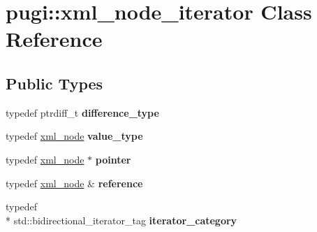 \hypertarget{classpugi_1_1xml__node__iterator}{\section{pugi\+:\+:xml\+\_\+node\+\_\+iterator Class Reference}
\label{classpugi_1_1xml__node__iterator}
}
\subsection*{Public Types}
\begin{DoxyCompactItemize}
\item 
\hypertarget{classpugi_1_1xml__node__iterator_af493930602ec2f56d27c84d148d692ef}{typedef ptrdiff\+\_\+t {\bfseries difference\+\_\+type}}\label{classpugi_1_1xml__node__iterator_af493930602ec2f56d27c84d148d692ef}

\item 
\hypertarget{classpugi_1_1xml__node__iterator_a2b0d0c1dd1238c23ef07feeb6069393f}{typedef \hyperlink{classpugi_1_1xml__node}{xml\+\_\+node} {\bfseries value\+\_\+type}}\label{classpugi_1_1xml__node__iterator_a2b0d0c1dd1238c23ef07feeb6069393f}

\item 
\hypertarget{classpugi_1_1xml__node__iterator_a8e5476d1f854eb64f92f42dac648acf1}{typedef \hyperlink{classpugi_1_1xml__node}{xml\+\_\+node} $\ast$ {\bfseries pointer}}\label{classpugi_1_1xml__node__iterator_a8e5476d1f854eb64f92f42dac648acf1}

\item 
\hypertarget{classpugi_1_1xml__node__iterator_ae2efdeb44673427f99b7cc1e726bfa13}{typedef \hyperlink{classpugi_1_1xml__node}{xml\+\_\+node} \& {\bfseries reference}}\label{classpugi_1_1xml__node__iterator_ae2efdeb44673427f99b7cc1e726bfa13}

\item 
\hypertarget{classpugi_1_1xml__node__iterator_ac65c62a919aa8818f0f1204ef0ab24c1}{typedef \\*
std\+::bidirectional\+\_\+iterator\+\_\+tag {\bfseries iterator\+\_\+category}}\label{classpugi_1_1xml__node__iterator_ac65c62a919aa8818f0f1204ef0ab24c1}

\end{DoxyCompactItemize}
